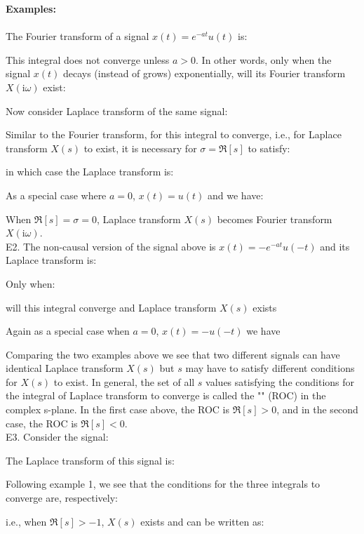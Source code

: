 	\begin{tcolorbox}[colframe=black,colback=white,sharp corners]
	\textbf{{\Large {}}Examples:}\\\\
	The Fourier transform of a signal $x(t)=e^{-at}u(t)$ is:
	
	This integral does not converge unless $a>0$. In other words, only when the signal $x(t)$ decays (instead of grows) exponentially, will its Fourier transform  $X(\mathrm{i}\omega)$ exist:
	
	
	Now consider Laplace transform of the same signal:
	
	Similar to the Fourier transform, for this integral to converge, i.e., for Laplace transform $X(s)$ to exist, it is necessary for $\sigma=\Re[s]$ to satisfy:
	
	in which case the Laplace transform is:
	
	As a special case where $a=0$, $x(t)=u(t)$ and we have:
	
	When $ \Re[s]=\sigma=0$, Laplace transform $X(s)$ becomes Fourier transform $X(\mathrm{i}\omega)$. \\
	
	E2. The non-causal version of the signal above is $x(t)=-e^{-at}u(-t)$ and its Laplace transform is:
	
	\end{tcolorbox}
	
	\begin{tcolorbox}[colframe=black,colback=white,sharp corners]
	Only when:
	
	will this integral converge and Laplace transform $X(s)$ exists
	
	Again as a special case when $a=0$, $x(t)=-u(-t)$ we have
	
	Comparing the two examples above we see that two different signals can have identical Laplace transform $X(s)$ but $s$ may have to satisfy different conditions for $X(s)$ to exist. In general, the set of all $s$ values satisfying the conditions for the integral of Laplace transform to converge is called the "" (ROC) in the complex s-plane. In the first case above, the ROC is $\Re[s]>0$, and in the second case, the ROC is $\Re[s]<0$.\\
	
	E3. Consider the signal:
	
	The Laplace transform of this signal is:
	
	Following example 1, we see that the conditions for the three integrals to converge are, respectively:
	
	i.e., when $\Re[s]>-1$, $X(s)$ exists and can be written as:
	
	\end{tcolorbox}
	
